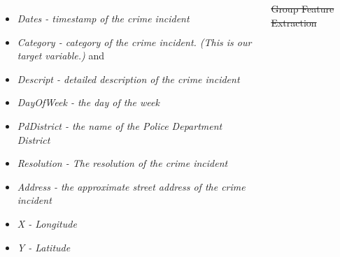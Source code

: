\documentclass{tikzposter} %
\providecommand{\DIFdeltex}[1]{{\protect\color{red}\sout{#1}}}                      %
\providecommand{\DIFaddend}{} %
\providecommand{\DIFdelbegin}{} %
\providecommand{\DIFdel}[1]{\texorpdfstring{\DIFdeltex{#1}}{}} %
\newcommand{\DIFscaledelfig}{0.5}
\newlength{\DIFdelgraphicswidth} %
\newlength{\DIFdelgraphicsheight} %
\newcommand{\DIFdelincludegraphics}[2][]{%
\sbox{\DIFdelgraphicsbox}{\DIFOincludegraphics[#1]{#2}}%
\settoboxwidth{\DIFdelgraphicswidth}{\DIFdelgraphicsbox} %
\settoboxtotalheight{\DIFdelgraphicsheight}{\DIFdelgraphicsbox} %
\scalebox{\DIFscaledelfig}{%
\parbox[b]{\DIFdelgraphicswidth}{\usebox{\DIFdelgraphicsbox}\\[-\baselineskip] \rule{\DIFdelgraphicswidth}{0em}}\llap{\resizebox{\DIFdelgraphicswidth}{\DIFdelgraphicsheight}{%
\setlength{\unitlength}{\DIFdelgraphicswidth}%
\begin{picture}(1,1)%
\thicklines\linethickness{2pt} %
{\color[rgb]{1,0,0}\put(0,0){\framebox(1,1){}}}%
{\color[rgb]{1,0,0}\put(0,0){\line( 1,1){1}}}%
{\color[rgb]{1,0,0}\put(0,1){\line(1,-1){1}}}%
\end{picture}%
}\hspace*{3pt}}} %
} %
\DeclareRobustCommand{\DIFaddend}{\DIFOaddend \let\includegraphics\DIFOincludegraphics} %
\DeclareRobustCommand{\DIFdelbegin}{\DIFOdelbegin \let\includegraphics\DIFdelincludegraphics} %
\begin{document}
\begin{columns}
{\begin{itemize}
    \item
    \emph{Dates - timestamp of the crime incident}
    \item
    \emph{ Category - category of the crime incident. (This is our target variable.)} and
    \item 
    \emph{  Descript - detailed description of the crime incident}
    \item 
    \emph{  DayOfWeek - the day of the week}
    \item 
    \emph{ PdDistrict - the name of the Police Department District}
    \item 
    \emph{ Resolution - The resolution of the crime incident}
    \item 
    \emph{Address - the approximate street address of the crime incident }
    \item 
    \emph{X - Longitude}
    \item 
    \emph{Y - Latitude}
  \end{itemize}
}
\DIFaddend %







\DIFdelbegin %


\begin{description}%
\item[\DIFdel{Group Feature Extraction}]%


\end{description}
\end{columns}
\end{document}
